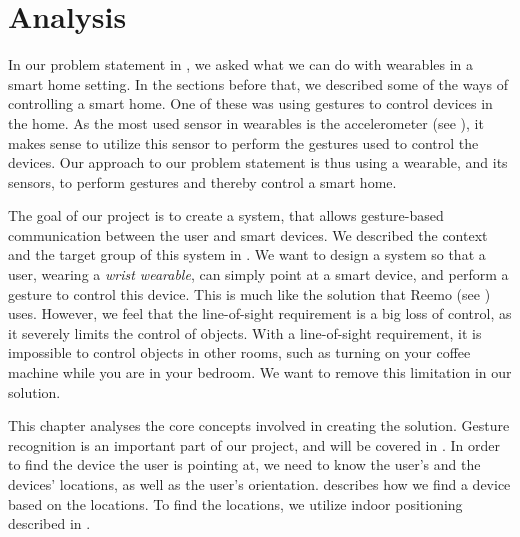 \chapter{Analysis}\label{chap:analysis}

In our problem statement in , 
we asked what we can do with wearables in a smart home setting.
In the sections before that, 
we described some of the ways of controlling a smart home. 
One of these was using gestures to control devices in the home. 
As the most used sensor in wearables is the accelerometer (see ), 
it makes sense to utilize this sensor to perform the gestures used to control the devices. 
Our approach to our problem statement is thus using a wearable, 
and its sensors, to perform gestures and thereby control a smart home. 

The goal of our project is to create a system, 
that allows gesture-based communication between the user and smart devices.
We described the context and the target group of this system in .
We want to design a system so that a user, wearing a \emph{wrist wearable}, 
can simply point at a smart device, 
and perform a gesture to control this device. 
This is much like the solution that Reemo (see ) uses. 
However, we feel that the line-of-sight requirement is a big loss of control, 
as it severely limits the control of objects.
With a line-of-sight requirement, 
it is impossible to control objects in other rooms, 
such as turning on your coffee machine while you are in your bedroom. 
We want to remove this limitation in our solution. 

This chapter analyses the core concepts involved in creating the solution.
Gesture recognition is an important part of our project, 
and will be covered in . 
In order to find the device the user is pointing at,
we need to know the user's and the devices' locations, 
as well as the user's orientation. 
 describes how we find a device based on the locations. 
To find the locations, we utilize indoor positioning described in .




